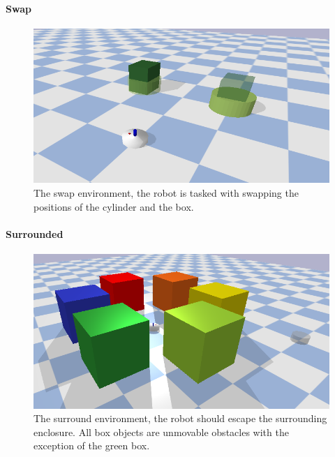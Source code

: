 

\paragraph{Swap}
\begin{figure}[H]
    \centering
    \includegraphics[width=13cm]{figures/tests/swap}
    \caption{The swap environment, the robot is tasked with swapping the positions of the cylinder and the box.}%
    \label{fig:benchmark_swap}
\end{figure}


\paragraph{Surrounded}
\begin{figure}[H]
    \centering
    \includegraphics[width=13cm]{figures/tests/surrounded}
    \caption{The surround environment, the robot should escape the surrounding enclosure. All box objects are unmovable obstacles with the exception of the green box.}%
    \label{fig:benchmark_surround}
\end{figure}


